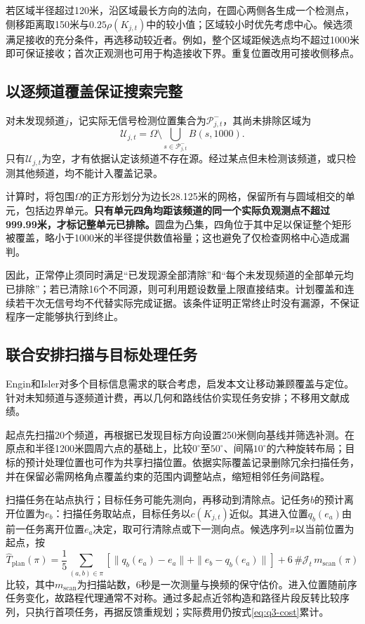 若区域半径超过120米，沿区域最长方向的法向，在圆心两侧各生成一个检测点，侧移距离取150米与$0.25\rho(K_{j,t})$中的较小值；区域较小时优先考虑中心。候选须满足接收的充分条件，再选移动较近者。例如，整个区域距候选点均不超过1000米即可保证接收；首次正观测也可用于构造接收下界。重复位置改用可接收侧移点。

\subsection{以逐频道覆盖保证搜索完整}

对未发现频道$j$，记实际无信号检测位置集合为$\mathcal P^-_{j,t}$，其尚未排除区域为
\begin{equation}
\mathcal U_{j,t}=\Omega\setminus
 \bigcup_{s\in\mathcal P^-_{j,t}}B(s,1000).
\label{eq:q3-uncovered}
\end{equation}
只有$\mathcal U_{j,t}$为空，才有依据认定该频道不存在源。经过某点但未检测该频道，或只检测其他频道，均不能计入覆盖记录。

计算时，将包围$\Omega$的正方形划分为边长28.125米的网格，保留所有与圆域相交的单元，包括边界单元。\textbf{只有单元四角均距该频道的同一个实际负观测点不超过999.99米，才标记整单元已排除。}圆盘为凸集，四角位于其中足以保证整个矩形被覆盖，略小于1000米的半径提供数值裕量；这也避免了仅检查网格中心造成漏判。

因此，正常停止须同时满足“已发现源全部清除”和“每个未发现频道的全部单元均已排除”；若已清除16个不同源，则可利用题设数量上限直接结束。计划覆盖和连续若干次无信号均不代替实际完成证据。该条件证明正常终止时没有漏源，不保证程序一定能够执行到终止。

\subsection{联合安排扫描与目标处理任务}

Engin和Isler对多个目标信息需求的联合考虑\cite{Engin2020}，启发本文让移动兼顾覆盖与定位。针对未知频道与逐频道计费，再以几何和路线估价实现任务安排；不移用文献成绩。

起点先扫描20个频道，再根据已发现目标方向设置250米侧向基线并筛选补测。在原点和半径1200米圆周六点的基础上，比较$0^\circ$至$50^\circ$、间隔$10^\circ$的六种旋转布局；目标的预计处理位置也可作为共享扫描位置。依据实际覆盖记录删除冗余扫描任务，并在保留必需网格角点覆盖约束的范围内调整站点，缩短相邻任务间路程。

扫描任务在站点执行；目标任务可能先测向，再移动到清除点。记任务$b$的预计离开位置为$e_b$：扫描任务取站点，目标任务以$c(K_{j,t})$近似。其进入位置$q_b(e_a)$由前一任务离开位置$e_a$决定，取可行清除点或下一测向点。候选序列$\pi$以当前位置为起点，按
\begin{equation}
\widehat T_{\mathrm{plan}}(\pi)=
\frac15\sum_{(a,b)\in\pi}
\left[\|q_b(e_a)-e_a\|+\|e_b-q_b(e_a)\|\right]
+6\,\#\mathcal J_t\,m_{\mathrm{scan}}(\pi)
\label{eq:q3-route-score}
\end{equation}
比较，其中$m_{\mathrm{scan}}$为扫描站数，6秒是一次测量与换频的保守估价。进入位置随前序任务变化，故路程代理通常不对称。通过多起点近邻构造和路径片段反转比较序列，只执行首项任务，再据反馈重规划；实际费用仍按式\eqref{eq:q3-cost}累计。

